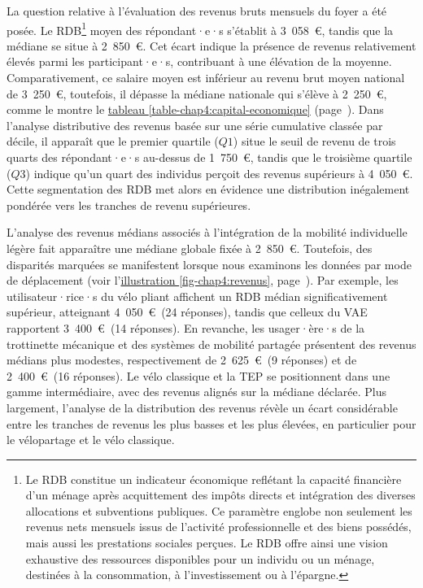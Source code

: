 \begin{refsegment}
La question relative à l'évaluation des revenus bruts mensuels du foyer a été posée. Le \acrfull{RDB}\footnote{
    Le \acrfull{RDB} constitue un indicateur économique reflétant la capacité financière d’un ménage après acquittement des impôts directs et intégration des diverses allocations et subventions publiques. Ce paramètre englobe non seulement les revenus nets mensuels issus de l'activité professionnelle et des biens possédés, mais aussi les prestations sociales perçues. Le \acrshort{RDB} offre ainsi une vision exhaustive des ressources disponibles pour un individu ou un ménage, destinées à la consommation, à l’investissement ou à l’épargne.
} moyen des répondant·e·s s'établit à 3~058~\euro, tandis que la médiane se situe à 2~850~\euro. Cet écart indique la présence de revenus relativement élevés parmi les participant·e·s, contribuant à une élévation de la moyenne. Comparativement, ce salaire moyen est inférieur au revenu brut moyen national de 3~250~\euro, toutefois, il dépasse la médiane nationale qui s'élève à 2~250~\euro, comme le montre le \hyperref[table-chap4:capital-economique]{tableau \ref{table-chap4:capital-economique}} (page~\pageref{table-chap4:capital-economique}). Dans l'analyse distributive des revenus basée sur une série cumulative classée par décile, il apparaît que le premier quartile (\(Q1\)) situe le seuil de revenu de trois quarts des répondant·e·s au-dessus de 1~750~\euro, tandis que le troisième quartile (\(Q3\)) indique qu'un quart des individus perçoit des revenus supérieurs à 4~050~\euro. Cette segmentation des \acrshort{RDB} met alors en évidence une distribution inégalement pondérée vers les tranches de revenu supérieures.%

L'analyse des revenus médians associés à l'intégration de la mobilité individuelle légère fait apparaître une médiane globale fixée à 2~850~\euro. Toutefois, des disparités marquées se manifestent lorsque nous examinons les données par mode de déplacement (voir l'\hyperref[fig-chap4:revenus]{illustration \ref{fig-chap4:revenus}}, page~\pageref{fig-chap4:revenus}). Par exemple, les utilisateur·rice·s du vélo pliant affichent un \acrshort{RDB} médian significativement supérieur, atteignant 4~050~\euro~(24 réponses), tandis que celleux du \acrshort{VAE} rapportent 3~400~\euro~(14 réponses). En revanche, les usager·ère·s de la trottinette mécanique et des systèmes de mobilité partagée présentent des revenus médians plus modestes, respectivement de 2~625~\euro~(9 réponses) et de 2~400~\euro~(16 réponses). Le vélo classique et la \acrshort{TEP} se positionnent dans une gamme intermédiaire, avec des revenus alignés sur la médiane déclarée. Plus largement, l'analyse de la distribution des revenus révèle un écart considérable entre les tranches de revenus les plus basses et les plus élevées, en particulier pour le vélopartage et le vélo classique.%


\end{refsegment}
